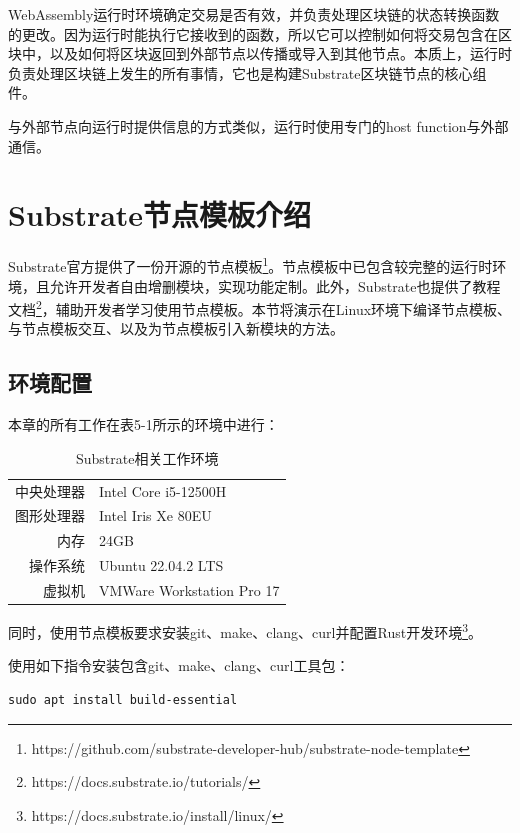 WebAssembly运行时环境确定交易是否有效，并负责处理区块链的状态转换函数的更改。因为运行时能执行它接收到的函数，所以它可以控制如何将交易包含在区块中，以及如何将区块返回到外部节点以传播或导入到其他节点。本质上，运行时负责处理区块链上发生的所有事情，它也是构建Substrate区块链节点的核心组件。

与外部节点向运行时提供信息的方式类似，运行时使用专门的host function与外部通信。

\section{Substrate节点模板介绍}

Substrate官方提供了一份开源的节点模板\footnote{https://github.com/substrate-developer-hub/substrate-node-template}。节点模板中已包含较完整的运行时环境，且允许开发者自由增删模块，实现功能定制。此外，Substrate也提供了教程文档\footnote{https://docs.substrate.io/tutorials/}，辅助开发者学习使用节点模板。本节将演示在Linux环境下编译节点模板、与节点模板交互、以及为节点模板引入新模块的方法。

\subsection{环境配置}

本章的所有工作在表5-1所示的环境中进行：

\begin{table}[htbp]
    \linespread{1.5}
    \centering
    \caption{Substrate相关工作环境}\label{Substrate相关工作环境}
    \begin{tabular}{r|l} \toprule
        中央处理器 & Intel Core i5-12500H      \\
        图形处理器 & Intel Iris Xe 80EU        \\
        内存    & 24GB                      \\
        操作系统  & Ubuntu 22.04.2 LTS        \\
        虚拟机   & VMWare Workstation Pro 17 \\
        \bottomrule
    \end{tabular}
\end{table}

同时，使用节点模板要求安装git、make、clang、curl并配置Rust开发环境\footnote{https://docs.substrate.io/install/linux/}。

使用如下指令安装包含git、make、clang、curl工具包：

\begin{lstlisting}[caption={安装工具包}, label={lst:安装工具包}]
sudo apt install build-essential
\end{lstlisting}

